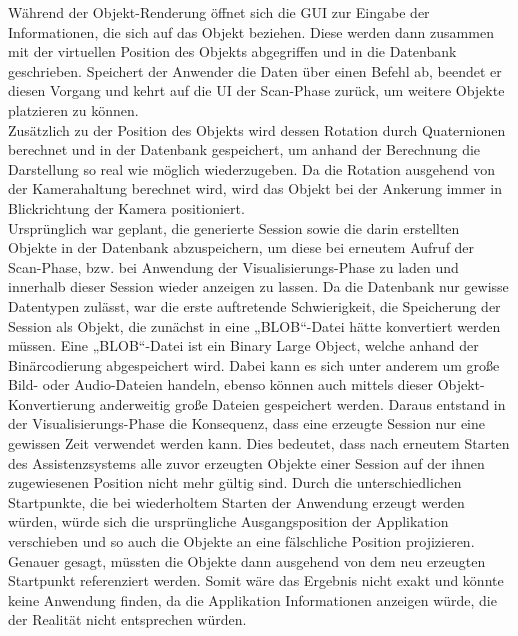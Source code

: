 Während der Objekt-Renderung öffnet sich die \acs{GUI} zur Eingabe der Informationen, die sich auf das Objekt beziehen. Diese 
werden dann zusammen mit der virtuellen Position des Objekts abgegriffen und in die Datenbank geschrieben. Speichert der Anwender die Daten über einen Befehl ab, 
beendet er diesen Vorgang und kehrt auf die \acs{UI} der Scan-Phase zurück, um weitere Objekte platzieren zu können. 
\\ 
Zusätzlich zu der Position des Objekts wird dessen Rotation durch Quaternionen berechnet und in der Datenbank gespeichert, um anhand der Berechnung 
die Darstellung so real wie möglich wiederzugeben. Da die Rotation ausgehend von der Kamerahaltung berechnet wird, wird das Objekt bei der Ankerung immer in 
Blickrichtung der Kamera positioniert.
\\ 
\linebreak
Ursprünglich war geplant, die generierte Session sowie die darin erstellten Objekte in der Datenbank abzuspeichern, um diese bei erneutem Aufruf der 
Scan-Phase, bzw. bei Anwendung der Visualisierungs-Phase zu laden und innerhalb dieser Session wieder anzeigen zu lassen. Da die Datenbank nur gewisse Datentypen 
zulässt, war die erste auftretende Schwierigkeit, die Speicherung der Session als Objekt, die zunächst in eine „BLOB“-Datei hätte konvertiert werden müssen. Eine 
„BLOB“-Datei ist ein Binary Large Object, welche anhand der Binärcodierung abgespeichert wird. Dabei kann es sich unter anderem um große 
Bild- oder Audio-Dateien handeln, ebenso können auch mittels dieser Objekt-Konvertierung anderweitig große Dateien gespeichert werden. Daraus entstand in der Visualisierungs-Phase die 
Konsequenz, dass eine erzeugte Session nur eine gewissen Zeit verwendet werden kann. Dies bedeutet, dass nach erneutem 
Starten des Assistenzsystems alle zuvor erzeugten Objekte einer Session auf der ihnen zugewiesenen Position nicht mehr gültig sind. Durch die unterschiedlichen 
Startpunkte, die bei wiederholtem Starten der Anwendung erzeugt werden würden, würde sich die ursprüngliche Ausgangsposition der Applikation verschieben und so auch 
die Objekte an eine fälschliche Position projizieren. Genauer gesagt, müssten die Objekte dann ausgehend von dem neu erzeugten Startpunkt referenziert werden. Somit wäre das 
Ergebnis nicht exakt und könnte keine Anwendung finden, da die Applikation Informationen anzeigen würde, die der Realität nicht entsprechen würden. 
\\ 
